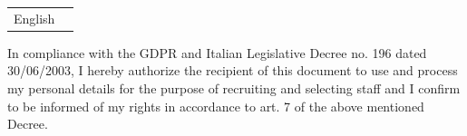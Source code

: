 \documentclass[a4paper,10pt]{article}
\begin{document}
\begin{adjustbox}{valign=t}
\begin{minipage}{0.6\textwidth}
\begin{description}
\begin{multicols}{2}
\begin{tabular}{ll}
	English 	& \SkillBull{$\bullet \bullet \bullet \, \circ$}\\
\end{tabular}
\end{multicols}
\end{description}

\LastUpdate


\tiny In compliance with the GDPR and Italian Legislative Decree no. 196 dated 30/06/2003, I hereby authorize the recipient of this document to use and process my personal details for the purpose of recruiting and selecting staff and I confirm to be informed of my rights in accordance to art. 7 of the above mentioned Decree.

\end{minipage}
\end{adjustbox}
\end{document}
